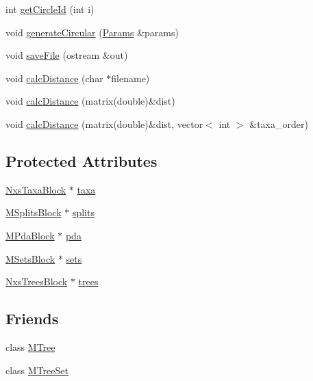 \begin{DoxyCompactItemize}
\item 
int \hyperlink{classSplitGraph_a3c7c98462a61153525cb22439f6872ff}{getCircleId} (int i)
\item 
void \hyperlink{classSplitGraph_a49e61357ca80dc01cc75891c1316a921}{generateCircular} (\hyperlink{structParams}{Params} \&params)
\item 
void \hyperlink{classSplitGraph_ac00dacfe044abd770bb24b5714035742}{saveFile} (ostream \&out)
\item 
void \hyperlink{classSplitGraph_aff71095a191dc17326d6da9441496c37}{calcDistance} (char $\ast$filename)
\item 
void \hyperlink{classSplitGraph_a1cbeb318350af0d36f70b03ae11bd46d}{calcDistance} (matrix(double)\&dist)
\item 
void \hyperlink{classSplitGraph_a9e96c1c785114aa2fc0c998702345228}{calcDistance} (matrix(double)\&dist, vector$<$ int $>$ \&taxa\_\-order)
\end{DoxyCompactItemize}
\subsection*{Protected Attributes}
\begin{DoxyCompactItemize}
\item 
\hyperlink{classNxsTaxaBlock}{NxsTaxaBlock} $\ast$ \hyperlink{classSplitGraph_a3166d128ac9e267baf86d309deadb988}{taxa}
\item 
\hyperlink{classMSplitsBlock}{MSplitsBlock} $\ast$ \hyperlink{classSplitGraph_a42f7001d83a322db0b47a4bab44eeebd}{splits}
\item 
\hyperlink{classMPdaBlock}{MPdaBlock} $\ast$ \hyperlink{classSplitGraph_ab5bb72994879bbc43abf1b48f1278c21}{pda}
\item 
\hyperlink{classMSetsBlock}{MSetsBlock} $\ast$ \hyperlink{classSplitGraph_ac46902cb0a5a2c914c657f0434d004bd}{sets}
\item 
\hyperlink{classNxsTreesBlock}{NxsTreesBlock} $\ast$ \hyperlink{classSplitGraph_ad3f25cc271cafddeb348ba92cbcb9f59}{trees}
\end{DoxyCompactItemize}
\subsection*{Friends}
\begin{DoxyCompactItemize}
\item 
\hypertarget{classSplitGraph_a7a747beac427dfc013c53501e474d452}{
class \hyperlink{classSplitGraph_a7a747beac427dfc013c53501e474d452}{MTree}}
\label{classSplitGraph_a7a747beac427dfc013c53501e474d452}

\item 
\hypertarget{classSplitGraph_a0f5ece1842cb079997e8b0826d310fcd}{
class \hyperlink{classSplitGraph_a0f5ece1842cb079997e8b0826d310fcd}{MTreeSet}}
\label{classSplitGraph_a0f5ece1842cb079997e8b0826d310fcd}

\end{DoxyCompactItemize}


